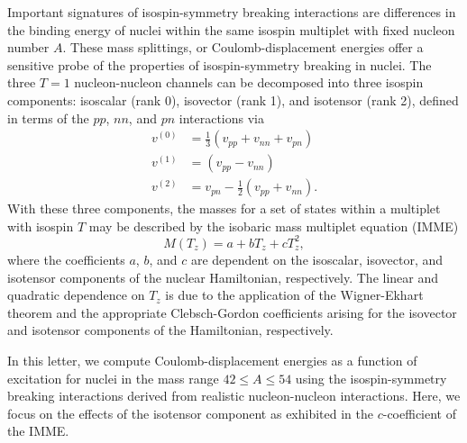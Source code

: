 \documentclass[10pt,showpacs,preprintnumbers,footinbib,amsmath,amssymb,aps,prl,twocolumn,groupedaddress,superscriptaddress,showkeys]{revtex4-1}
\begin{document}
Important signatures of isospin-symmetry breaking interactions are
differences in the binding energy of nuclei within the same isospin
multiplet with fixed nucleon number $A$. These mass splittings, or
Coulomb-displacement energies offer a sensitive probe of the
properties of isospin-symmetry breaking in nuclei. The three $T=1$
nucleon-nucleon channels can be decomposed into three isospin
components: isoscalar (rank 0), isovector (rank 1), and isotensor
(rank 2), defined in terms of the $pp$, $nn$, and $pn$ interactions
via
\begin{align}
\label{e:1}
v^{(0)} & =  \frac{1}{3} (v_{pp} + v_{nn} + v_{pn}) \\
\label{e:2}
v^{(1)} & =  (v_{pp} - v_{nn}) \\
\label{e:3}
v^{(2)} & =  v_{pn} - \frac{1}{2}(v_{pp} + v_{nn}).
\end{align}
With these three components, the masses for a set of states within a multiplet with isospin $T$ may be described by the isobaric mass multiplet equation (IMME)
\begin{equation}
M (T_z) = a + bT_z + cT_z^2,
\end{equation}
where the coefficients $a$, $b$, and $c$ are dependent on the
isoscalar, isovector, and isotensor components of the nuclear
Hamiltonian, respectively. The linear and quadratic dependence on
$T_z$ is due to the application of the Wigner-Ekhart theorem and the
appropriate Clebsch-Gordon coefficients arising for the isovector and
isotensor components of the Hamiltonian, respectively.

In this letter, we compute Coulomb-displacement energies as a function
of excitation for nuclei in the mass range $42 \le A \le 54$ using the
isospin-symmetry breaking interactions derived from realistic
nucleon-nucleon interactions. Here, we focus on the effects of the
isotensor component as exhibited in the $c$-coefficient of the IMME.
\end{document}

